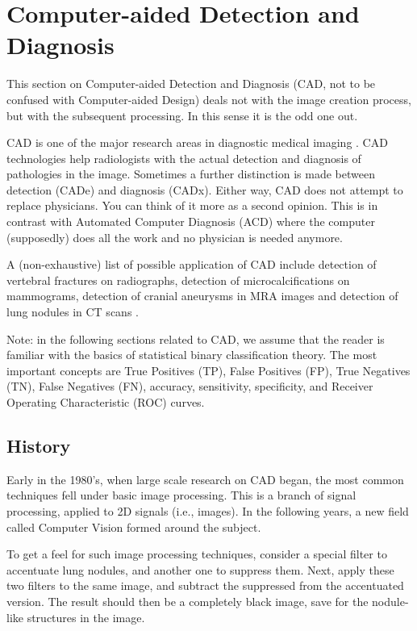 \section{Computer-aided Detection and Diagnosis}
This section on Computer-aided Detection and Diagnosis (CAD, not to be
confused with Computer-aided Design) deals not with the image creation process,
but with the subsequent processing. In this sense it is the odd one out.

CAD is one of the major research areas in diagnostic medical imaging
\cite{cadhistory}. CAD technologies help radiologists with the actual detection
and diagnosis of pathologies in the image. Sometimes a further distinction is
made between detection (CADe) and diagnosis (CADx). Either way, CAD does not
attempt to replace physicians. You can think of it more as a second opinion.
This is in contrast with Automated Computer Diagnosis (ACD) where the computer
(supposedly) does all the work and no physician is needed anymore.

A (non-exhaustive) list of possible application of CAD include detection of
vertebral fractures on radiographs, detection of microcalcifications on
mammograms, detection of cranial aneurysms in MRA images and detection of lung
nodules in CT scans \cite{cadhistory}.

Note: in the following sections related to CAD, we assume that the reader is
familiar with the basics of statistical binary classification theory. The most
important concepts are True Positives (TP), False Positives (FP), True Negatives
(TN), False Negatives (FN), accuracy, sensitivity, specificity, and Receiver
Operating Characteristic (ROC) curves.


\subsection{History}
Early in the 1980's, when large scale research on CAD began, the most common
techniques fell under basic image processing. This is a branch of signal
processing, applied to 2D signals (i.e., images). In the following years, a new
field called Computer Vision formed around the subject. 

To get a feel for such image processing techniques, consider a special filter
to accentuate lung nodules, and another one to suppress them. Next, apply these
two filters to the same image, and subtract the suppressed from the accentuated
version. The result should then be a completely black image, save for the
nodule-like structures in the image. 

